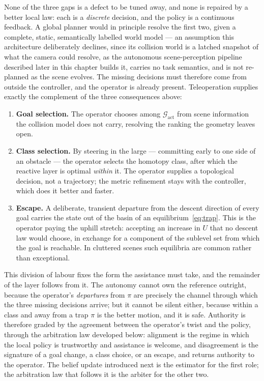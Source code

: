 None of the three gaps is a defect to be tuned away, and none is repaired by a better local law: each is a \emph{discrete} decision, and the policy is a continuous feedback. A global planner would in principle resolve the first two, given a complete, static, semantically labelled world model --- an assumption this architecture deliberately declines, since its collision world is a latched snapshot of what the camera could resolve, as the autonomous scene-perception pipeline described later in this chapter builds it, carries no task semantics, and is not re-planned as the scene evolves. The missing decisions must therefore come from outside the controller, and the operator is already present. Teleoperation supplies exactly the complement of the three consequences above:
\begin{enumerate}[nosep]
\item \textbf{Goal selection.} The operator chooses among $\mathcal{G}_{\text{act}}$ from scene information the collision model does not carry, resolving the ranking the geometry leaves open.
\item \textbf{Class selection.} By steering in the large --- committing early to one side of an obstacle --- the operator selects the homotopy class, after which the reactive layer is optimal \emph{within} it. The operator supplies a topological decision, not a trajectory; the metric refinement stays with the controller, which does it better and faster.
\item \textbf{Escape.} A deliberate, transient departure from the descent direction of every goal carries the state out of the basin of an equilibrium~\eqref{eq:trap}. This is the operator paying the uphill stretch: accepting an increase in $U$ that no descent law would choose, in exchange for a component of the sublevel set from which the goal is reachable. In cluttered scenes such equilibria are common rather than exceptional.
\end{enumerate}
This division of labour fixes the form the assistance must take, and the remainder of the layer follows from it. The autonomy cannot own the reference outright, because the operator's \emph{departures} from $\pi$ are precisely the channel through which the three missing decisions arrive; but it cannot be silent either, because within a class and away from a trap $\pi$ is the better motion, and it is safe. Authority is therefore graded by the agreement between the operator's twist and the policy, through the arbitration law developed below: alignment is the regime in which the local policy is trustworthy and assistance is welcome, and disagreement is the signature of a goal change, a class choice, or an escape, and returns authority to the operator. The belief update introduced next is the estimator for the first role; the arbitration law that follows it is the arbiter for the other two.

